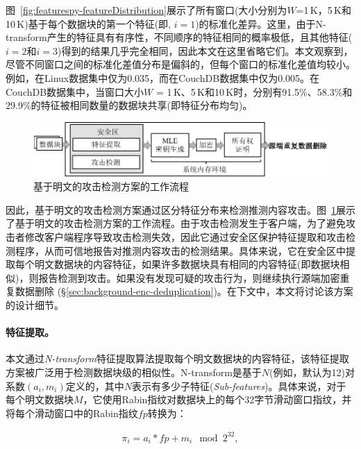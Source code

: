 图~\ref{fig:featurespy-featureDistribution}展示了所有窗口(大小分别为$W$=1\,K，5\,K和10\,K)基于每个数据块的第一个特征(即, $i = 1$)的标准化差异。这里，由于N-transform产生的特征具有有序性，不同顺序的特征相同的概率极低，且其他特征($i = 2$和$i = 3$)得到的结果几乎完全相同，因此本文在这里省略它们。本文观察到，尽管不同窗口之间的标准化差值分布是偏斜的，但每个窗口的标准化差值均较小。例如，在Linux数据集中仅为0.035，而在CouchDB数据集中仅为0.005。在CouchDB数据集中，当窗口大小$W$ = 1\,K、5\,K和10\,K时，分别有91.5\%、58.3\%和29.9\%的特征被相同数量的数据块共享(即特征分布均匀)。

\begin{figure}[!htb]
    \centering
    \includegraphics[width=\textwidth]{pic/featurespy/naive.pdf}
    \caption{基于明文的攻击检测方案的工作流程}
    \label{fig:featurespy-architecture-strawman}
\end{figure}

因此，基于明文的攻击检测方案通过区分特征分布来检测推测内容攻击。图~\ref{fig:featurespy-architecture-strawman}展示了基于明文的攻击检测方案的工作流程。由于攻击检测发生于客户端，为了避免攻击者修改客户端程序导致攻击检测失效，因此它通过安全区保护特征提取和攻击检测程序，从而可信地报告对推测内容攻击的检测结果。具体来说，它在安全区中提取每个明文数据块的内容特征，如果许多数据块具有相同的内容特征(即数据块相似)，则报告检测到攻击。如果没有发现可疑的攻击行为，则继续执行源端加密重复数据删除 (\S\ref{sec:background-enc-deduplication})。在下文中，本文将讨论该方案的设计细节。

\paragraph*{特征提取。}
本文通过\textit{N-transform}特征提取算法提取每个明文数据块的内容特征，该特征提取方案被广泛用于检测数据块级的相似性。N-transform是基于$N$(例如，默认为12)对系数$(a_i, m_i)$定义的，其中$N$表示有多少子特征(\textit{Sub-features})。具体来说，对于每个明文数据块$M$，它使用Rabin指纹对数据块上的每个32字节滑动窗口指纹，并将每个滑动窗口中的Rabin指纹$fp$转换为：

\begin{eqnarray}
    \label{eq:featurespy-feature}
    \pi_i = a_i * fp + m_i \mod 2^{32},
\end{eqnarray}

